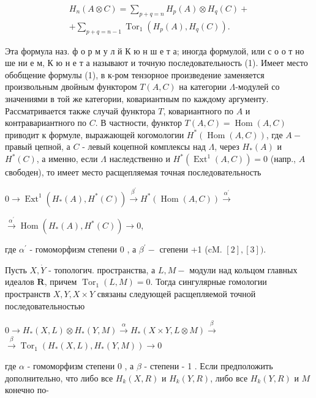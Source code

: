 \documentclass[10pt]{article}
\begin{document}
\[

\begin{gathered}

H_{n}(A \otimes C)=\sum_{p+q=n} H_{p}(A) \otimes H_{q}(C)+ \\

+\sum_{p+q=n-1} \operatorname{Tor}_{1}\left(H_{p}(A), H_{q}(C)\right) .

\end{gathered}

\]



Эта формула наз. ф о р м у л й К ю н ш е т а; иногда формулой, или с о о т но ше ни е м, К ю н е т а называют и точную последовательность (1). Имеет место обобщение формулы (1), в к-ром тензорное произведение заменяется произвольным двойным функтором $T(A, C)$ на категории $\Lambda$-модулей со значениями в той же категории, ковариантным по каждому аргументу. Рассматривается также случай функтора $T$, ковариантного по $A$ и контравариантного по $C$. В частности, функтор $T(A, C)=\operatorname{Hom}(A, C)$ приводит к формуле, выражающей когомологии $H^{*}(\operatorname{Hom}(A, C))$, где $A-$ правый цепной, а $C$ - левый коцепной комплексы над $\Lambda$, через $H_{*}(A)$ и $H^{*}(C)$, а именно, если $\Lambda$ наследственно и $H^{*}\left(\operatorname{Ext}^{1}(A, C)\right)=0$ (напр., $A$ свободен), то имеет место расщепляемая точная последовательность



$0 \longrightarrow \operatorname{Ext}^{1}\left(H_{*}(A), H^{*}(C)\right) \stackrel{\beta^{\prime}}{\longrightarrow} H^{*}(\operatorname{Hom}(A, C)) \stackrel{\alpha^{\prime}}{\longrightarrow}$



$\stackrel{\alpha^{\prime}}{\longrightarrow} \operatorname{Hom}\left(H_{*}(A), H^{*}(C)\right) \longrightarrow 0$,



где $\alpha^{\prime}$ - гомоморфизм степени 0 , а $\beta^{\prime}-$ сгепени +1 (cM. $[2],[3])$.



Пусть $X, \dot{Y}$ - топологич. пространства, а $L, M-$ модули над кольцом главных идеалов $\boldsymbol{R}$, причем $\operatorname{Tor}_{1}(L, M)=0$. Тогда сингулярные гомологии пространств $X, Y, X \times Y$ связаны следующей расщепляемой точной последовательностью



$0 \longrightarrow H_{*}(X, L) \otimes H_{*}(Y, M) \stackrel{\alpha}{\longrightarrow} H_{*}(X \times Y, L \otimes M) \stackrel{\beta}{\longrightarrow}$ $\stackrel{\beta}{\longrightarrow} \operatorname{Tor}_{1}\left(H_{*}(X, L), H_{*}(Y, M)\right) \longrightarrow 0$



где $\alpha$ - гомоморфизм степени 0 , а $\beta$ - степени - 1 . Если предположить дополнительно, что либо все $H_{k}(X, R)$ и $H_{k}(Y, R)$, либо все $H_{k}(Y, R)$ и $M$ конечно по-
\end{document}

